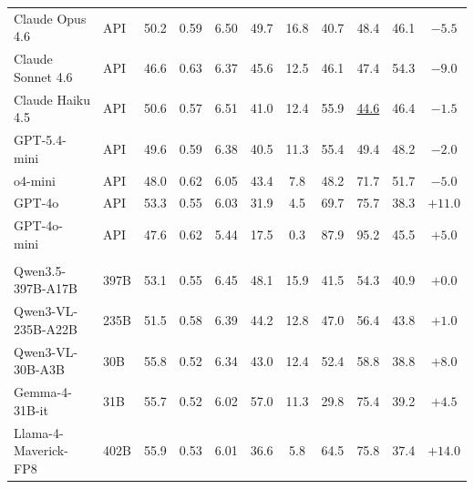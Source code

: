 \documentclass{llmxive}
\providecommand{\opengroup}[1]{\rowcolor{groupred}\multicolumn{#1}{l}{\hspace{-0.3em}\textit{\textbf{Open-source Models}}}}
\providecommand{\second}[1]{\underline{#1}}
\begin{document}
\begin{table}[t]
{\begin{tabular}{l@{\hspace{0.4em}}l@{\hspace{1.0em}}cccc@{\hspace{1.0em}}cccc@{\hspace{1.0em}}c}
Claude Opus 4.6~\cite{anthropic2025claudeopus46}     & API & 50.2          & 0.59        & 6.50          & 49.7         & 16.8          & 40.7          & 48.4          & 46.1          & $-5.5$  \\
Claude Sonnet 4.6~\cite{anthropic2025claudesonnet46} & API & 46.6          & 0.63        & 6.37          & 45.6         & 12.5          & 46.1          & 47.4          & 54.3          & $-9.0$  \\
Claude Haiku 4.5~\cite{anthropic2025claudehaiku45}   & API & 50.6          & 0.57        & 6.51          & 41.0         & 12.4          & 55.9          & \second{44.6} & 46.4          & $-1.5$  \\
GPT-5.4-mini~\cite{openai2025gpt54mini}      & API & 49.6          & 0.59        & 6.38          & 40.5         & 11.3          & 55.4          & 49.4          & 48.2          & $-2.0$  \\
o4-mini~\cite{openai2025o4mini}              & API & 48.0          & 0.62        & 6.05          & 43.4         &  7.8          & 48.2          & 71.7          & 51.7          & $-5.0$  \\
GPT-4o~\cite{openai2024gpt4o}                & API & 53.3          & 0.55        & 6.03          & 31.9         &  4.5          & 69.7          & 75.7          & 38.3          & $+11.0$ \\
GPT-4o-mini~\cite{openai2024gpt4o}           & API & 47.6          & 0.62        & 5.44          & 17.5         &  0.3          & 87.9          & 95.2          & 45.5          & $+5.0$  \\
\midrule
\opengroup{11} \\
Qwen3.5-397B-A17B~\cite{qwen2025qwen3}      & 397B & 53.1 & 0.55 & 6.45 & 48.1 & 15.9 & 41.5          & 54.3          & 40.9        & $+0.0$  \\
Qwen3-VL-235B-A22B~\cite{bai2025qwen25vl}   & 235B & 51.5 & 0.58 & 6.39 & 44.2 & 12.8 & 47.0          & 56.4          & 43.8        & $+1.0$  \\
Qwen3-VL-30B-A3B~\cite{bai2025qwen25vl}     & 30B  & 55.8 & 0.52 & 6.34 & 43.0 & 12.4 & 52.4          & 58.8          & 38.8        & $+8.0$  \\
Gemma-4-31B-it~\cite{deepmind2025gemma4}       & 31B  & 55.7 & 0.52 & 6.02 & 57.0 & 11.3 & 29.8          & 75.4          & 39.2        & $+4.5$  \\
Llama-4-Maverick-FP8~\cite{meta2025llama4maverick} & 402B & 55.9 & 0.53 & 6.01 & 36.6 &  5.8 & 64.5          & 75.8          & 37.4        & $+14.0$ \\

\end{tabular}}
\end{table}
\end{document}
